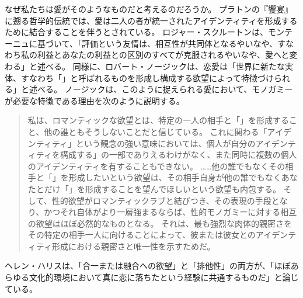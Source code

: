 \documentclass[paper=a4,book,openany]{jlreq}
\newcommand{\ig}[1]{}           %
\begin{document}
なぜ私たちは愛がそのようなものだと考えるのだろうか。
プラトンの『饗宴』に遡る哲学的伝統では、愛は二人の者が統一されたアイデンティティを形成するために結合することを伴うとされている。
ロジャー・スクルートンは、モンテーニュに基づいて、「評価という友情は、相互性が共同体となるやいなや、すなわち私の利益とあなたの利益との区別のすべてが克服されるやいなや、愛へと変わる」と述べる。
同様に、ロバート・ノージックは、恋愛は「世界に新たな実体、すなわち「」と呼ばれるものを形成し構成する欲望によって特徴づけられる」と述べる\citep[p.230]{scruton06:_sexual_desir}。
ノージックは、このように捉えられる愛において、モノガミーが必要な特徴である理由を次のように説明する。

\begin{quote}
私は、ロマンティックな欲望とは、特定の一人の相手と「」を形成すること、他の誰ともそうしないことだと信じている。
これに関わる「アイデンティティ」という観念の強い意味においては、個人が自分のアイデンティティを構成する」の一部でありえるわけがなく、また同時に複数の個人のアイデンティティを有することもできない。
……他の誰でもなくその相手と「」を形成したいという欲望は、その相手自身が他の誰でもなくあなたとだけ「」を形成することを望んでほしいという欲望も内包する。
そして、性的欲望がロマンティックラブと結びつき、その表現の手段となり、かつそれ自体がより一層強まるならば、性的モノガミーに対する相互の欲望はほぼ必然的なものとなる。
それは、最も強烈な肉体的親密さをその特定の相手一人に向けることによって、彼または彼女とのアイデンティティ形成における親密さと唯一性を示すためだ。
\citep[p.89]{nozick89:_examined_life}
\end{quote}

ヘレン・ハリス\ig{Helen Harris}は、「合一または融合への欲望」と「排他性」の両方が、「ほぼあらゆる文化的環境において真に恋に落ちたという経験に共通するものだ」と論じている\citep[pp. 102--103]{harris95:_rethin_polyn_heter_relat}。
\end{document}
